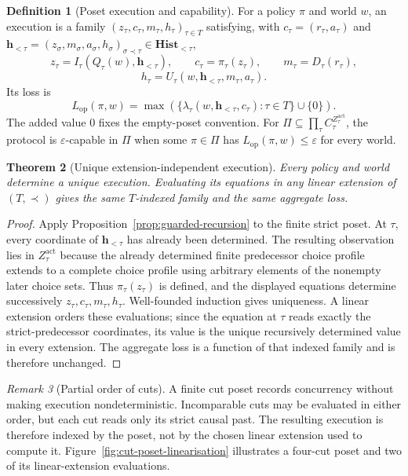 \documentclass[11pt]{article}
\theoremstyle{plain}
\newtheorem{theorem}{Theorem}[section]
\theoremstyle{definition}
\newtheorem{definition}[theorem]{Definition}
\theoremstyle{remark}
\newtheorem{remark}[theorem]{Remark}
\newcommand{\eps}{\varepsilon}
\begin{document}
\begin{definition}[Poset execution and capability]
\label{def:operational-execution}
For a policy $\pi$ and world $w$, an execution is a family
$(z_\tau,c_\tau,m_\tau,h_\tau)_{\tau\in T}$ satisfying, with
$c_\tau=(r_\tau,a_\tau)$ and
$\mathbf h_{<\tau}=(z_\sigma,m_\sigma,a_\sigma,h_\sigma)_{\sigma\prec\tau}\in
\mathbf{Hist}_{<\tau}$,
\[
z_\tau=I_\tau(Q_\tau(w),\mathbf h_{<\tau}),
\qquad c_\tau=\pi_\tau(z_\tau),
\qquad m_\tau=D_\tau(r_\tau),
\]
\[
h_\tau=U_\tau(w,\mathbf h_{<\tau},m_\tau,a_\tau).
\]
Its loss is
\[
L_{\mathrm{op}}(\pi,w)
=\max\left(
\{\lambda_\tau(w,\mathbf h_{<\tau},c_\tau):\tau\in T\}
\cup\{0\}\right).
\]
The added value $0$ fixes the empty-poset convention.
For $\Pi\subseteq\prod_\tau C_\tau^{Z_\tau^{\mathrm{act}}}$, the protocol is
$\eps$-capable in $\Pi$ when some $\pi\in\Pi$ has
$L_{\mathrm{op}}(\pi,w)\le\eps$ for every world.
\end{definition}

\begin{theorem}[Unique extension-independent execution]
\label{thm:operational-execution}
Every policy and world determine a unique execution. Evaluating its equations in
any linear extension of $(T,\prec)$ gives the same $T$-indexed family and the
same aggregate loss.
\end{theorem}

\begin{proof}
Apply Proposition~\ref{prop:guarded-recursion} to the finite strict poset. At
$\tau$, every
coordinate of $\mathbf h_{<\tau}$ has already been determined. The resulting
observation lies in $Z_\tau^{\mathrm{act}}$ because the already determined finite
predecessor choice profile extends to a complete choice profile using arbitrary
elements of the nonempty later choice sets. Thus $\pi_\tau(z_\tau)$ is defined,
and the displayed equations determine successively $z_\tau,c_\tau,m_\tau,h_\tau$. Well-founded
induction gives uniqueness. A linear extension orders these evaluations;
since the equation at $\tau$ reads exactly the strict-predecessor coordinates,
its value is the unique recursively determined value in every extension. The
aggregate loss is a function of that indexed family and is therefore unchanged.
\end{proof}

\begin{remark}[Partial order of cuts]
A finite cut poset records concurrency without making execution nondeterministic.
Incomparable cuts may be evaluated in either order, but each cut reads only its
strict causal past. The resulting execution is therefore indexed by the poset,
not by the chosen linear extension used to compute it.
Figure~\ref{fig:cut-poset-linearisation} illustrates a four-cut poset and two
of its linear-extension evaluations.
\end{remark}
\end{document}
